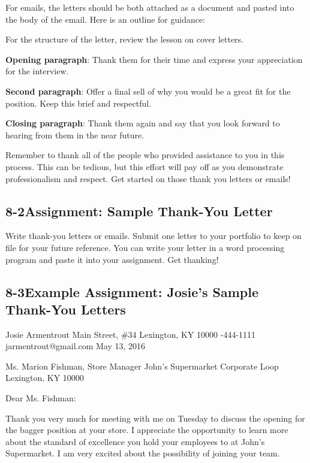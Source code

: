 For emails, the letters should be both attached as a document and pasted into the body of the email. Here is an outline for guidance:

For the structure of the letter, review the lesson on cover letters.

\textbf{Opening paragraph}: Thank them for their time and express your appreciation for the interview.

\textbf{Second paragraph}: Offer a final sell of why you would be a great fit for the position. Keep this brief and respectful.

\textbf{Closing paragraph}: Thank them again and say that you look forward to hearing from them in the near future.

Remember to thank all of the people who provided assistance to you in this process. This can be tedious, but this effort will pay off as you demonstrate professionalism and respect. Get started on those thank you letters or emails!
 
\pagebreak \subsection*{8-2\quad Assignment: Sample Thank-You Letter}
Write thank-you letters or emails. Submit one letter to your portfolio to keep on file for your future reference. You can write your letter in a word processing program and paste it into your assignment. Get thanking!

\pagebreak \subsection*{8-3\quad Example Assignment: Josie's Sample Thank-You Letters}
Josie Armentrout 
 Main Street, \#34
\break Lexington, KY 10000
-444-1111
\break jarmentrout@gmail.com 
\break May 13, 2016

Ms. Marion Fishman, 
\break Store Manager 
\break John's Supermarket
 Corporate Loop
\break Lexington, KY 10000

Dear Ms. Fishman:

Thank you very much for meeting with me on Tuesday to discuss the opening for the bagger position at your store. I appreciate the opportunity to learn more about the standard of excellence you hold your employees to at John's Supermarket. I am very excited about the possibility of joining your team.

